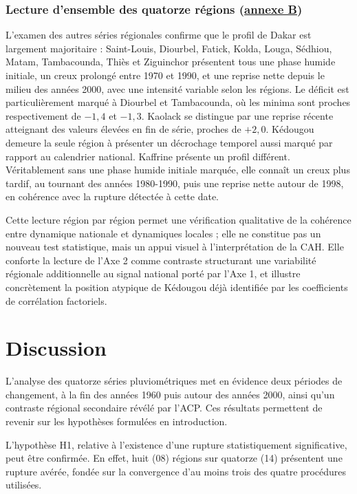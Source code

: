\documentclass[12pt,a4paper]{report}
\begin{document}
\subsubsection*{Lecture d'ensemble des quatorze régions (\hyperref[fig:ips-lisses-regions-annexe]{annexe B})}

L'examen des autres séries régionales confirme que le profil de Dakar est largement majoritaire : Saint-Louis, Diourbel, Fatick, Kolda, Louga, Sédhiou, Matam, Tambacounda, Thiès et Ziguinchor présentent tous une phase humide initiale, un creux prolongé entre 1970 et 1990, et une reprise nette depuis le milieu des années 2000, avec une intensité variable selon les régions. Le déficit est particulièrement marqué à Diourbel et Tambacounda, où les minima sont proches respectivement de $-1{,}4$ et $-1{,}3$. Kaolack se distingue par une reprise récente atteignant des valeurs élevées en fin de série, proches de $+2{,}0$. Kédougou demeure la seule région à présenter un décrochage temporel aussi marqué par rapport au calendrier national. Kaffrine présente un profil différent. Véritablement sans une phase humide initiale marquée, elle connaît un creux plus tardif, au tournant des années 1980-1990, puis une reprise nette autour de 1998, en cohérence avec la rupture détectée à cette date.

Cette lecture région par région permet une vérification qualitative de la cohérence entre dynamique nationale et dynamiques locales ; elle ne constitue pas un nouveau test statistique, mais un appui visuel à l'interprétation de la CAH. Elle conforte la lecture de l’Axe 2 comme contraste structurant une variabilité régionale additionnelle au signal national porté par l’Axe 1, et illustre concrètement la position atypique de Kédougou déjà identifiée par les coefficients de corrélation factoriels.

\section{Discussion}

L’analyse des quatorze séries pluviométriques met en évidence deux périodes de changement, à la fin des années 1960 puis autour des années 2000, ainsi qu’un contraste régional secondaire révélé par l’ACP. Ces résultats permettent de revenir sur les hypothèses formulées en introduction.

L’hypothèse H1, relative à l’existence d’une rupture statistiquement significative, peut être confirmée. En effet, huit (08) régions sur quatorze (14) présentent une rupture avérée, fondée sur la convergence d’au moins trois des quatre procédures utilisées.
\end{document}

